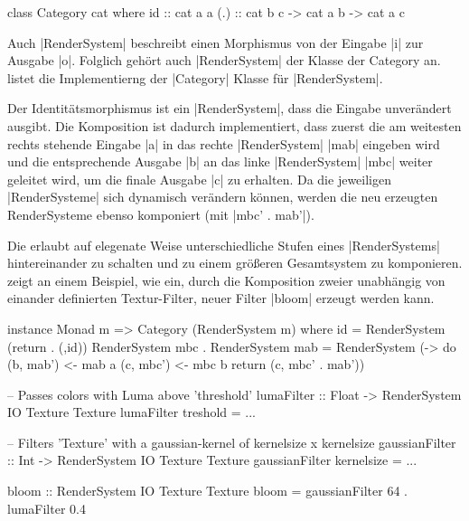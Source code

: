 \begin{haskell}[label={lst:class-category},caption={Category Klasse\protect\footnotemark},nolol]
class Category cat where
  id :: cat a a
  (.) :: cat b c -> cat a b -> cat a c
\end{haskell}

Auch |RenderSystem| beschreibt einen Morphismus von der Eingabe |i| zur Ausgabe |o|. Folglich gehört auch |RenderSystem| der Klasse der Category an.  listet die Implementierng der |Category| Klasse für |RenderSystem|. 

Der Identitätsmorphismus ist ein |RenderSystem|, dass die Eingabe unverändert ausgibt. Die Komposition ist dadurch implementiert, dass  zuerst die am weitesten rechts stehende Eingabe |a| in das rechte |RenderSystem| |mab| eingeben wird und die entsprechende Ausgabe |b| an das linke |RenderSystem| |mbc| weiter geleitet wird, um die finale Ausgabe |c| zu erhalten. Da die jeweiligen |RenderSysteme| sich dynamisch verändern können, werden die neu erzeugten RenderSysteme ebenso komponiert (mit |mbc' . mab'|). 

Die erlaubt auf elegenate Weise unterschiedliche Stufen eines |RenderSystems| hintereinander zu schalten und zu einem größeren Gesamtsystem zu komponieren.  zeigt an einem Beispiel, wie ein, durch die Komposition zweier unabhängig von einander definierten Textur-Filter, neuer Filter |bloom| erzeugt werden kann.

\begin{haskell}[label={lst:rendersystem-category},caption={Category Instanz für RenderSystem}]
instance Monad m => Category (RenderSystem m) where
  id = RenderSystem (return . (,id))
  RenderSystem mbc . RenderSystem mab = RenderSystem (\a -> do
    (b, mab') <- mab a
    (c, mbc') <- mbc b
    return (c, mbc' . mab'))
\end{haskell}

\begin{haskell}[label={lst:rendersystem-komposition-beispiel},caption={Beispiel einer Komposition von RenderSystem}]
-- Passes colors with Luma above 'threshold'
lumaFilter :: Float -> RenderSystem IO Texture Texture
lumaFilter treshold = ...

-- Filters 'Texture' with a gaussian-kernel of kernelsize x kernelsize
gaussianFilter :: Int -> RenderSystem IO Texture Texture
gaussianFilter kernelsize = ...

bloom :: RenderSystem IO Texture Texture
bloom = gaussianFilter 64 . lumaFilter 0.4
\end{haskell}


